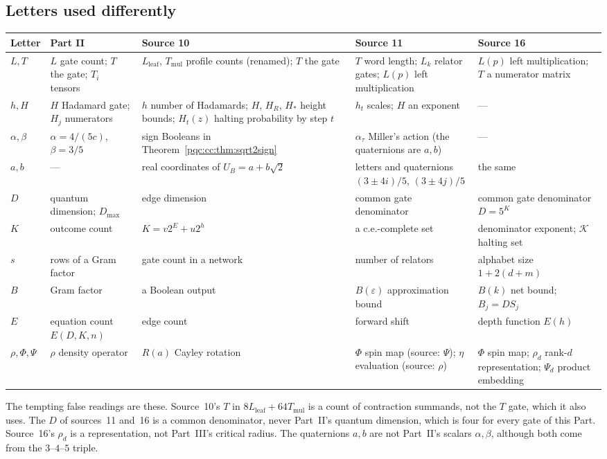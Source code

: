 \documentclass[11pt,letterpaper]{article}
\numberwithin{equation}{section}
\theoremstyle{definition}
\theoremstyle{remark}
\newcommand{\Dmax}{D_{\max}}
\newcommand{\eps}{\varepsilon}
\newcommand{\Lleaf}{L_{\mathrm{leaf}}}
\newcommand{\Tmul}{T_{\mathrm{mul}}}
\begin{document}
\subsection{Letters used differently}
\label{pqc:conv:b62-VI:letters}
\begin{center}
\small
\begin{tabularx}{\textwidth}{@{}lYYYY@{}}
\toprule
Letter & Part II & Source 10 & Source 11 & Source 16\\
\midrule
$L,T$ & $L$ gate count; $T$ the gate; $T_i$ tensors & $\Lleaf$, $\Tmul$ profile counts (renamed); $T$ the gate & $T$ word length; $L_k$ relator gates; $L(p)$ left multiplication & $L(p)$ left multiplication; $T$ a numerator matrix\\
$h,H$ & $H$ Hadamard gate; $H_j$ numerators & $h$ number of Hadamards; $H$, $H_R$, $H_*$ height bounds; $H_t(z)$ halting probability by step $t$ & $h_t$ scales; $H$ an exponent & ---\\
$\alpha,\beta$ & $\alpha=4/(5c)$, $\beta=3/5$ & sign Booleans in Theorem~\ref{pqc:cc:thm:sqrt2sign} & $\alpha_\tau$ Miller's action (the quaternions are $a,b$) & ---\\
$a,b$ & --- & real coordinates of $U_B=a+b\sqrt2$ & letters and quaternions $(3\pm4i)/5$, $(3\pm4j)/5$ & the same\\
$D$ & quantum dimension; $\Dmax$ & edge dimension & common gate denominator & common gate denominator $D=5^K$\\
$K$ & outcome count & $K=v2^E+u2^h$ & a c.e.-complete set & denominator exponent; $\mathcal K$ halting set\\
$s$ & rows of a Gram factor & gate count in a network & number of relators & alphabet size $1+2(d+m)$\\
$B$ & Gram factor & a Boolean output & $B(\eps)$ approximation bound & $B(k)$ net bound; $B_j=DS_j$\\
$E$ & equation count $E(D,K,n)$ & edge count & forward shift & depth function $E(h)$\\
$\rho,\Phi,\Psi$ & $\rho$ density operator & $R(a)$ Cayley rotation & $\Phi$ spin map (source: $\Psi$); $\eta$ evaluation (source: $\rho$) & $\Phi$ spin map; $\rho_d$ rank-$d$ representation; $\Psi_d$ product embedding\\
\bottomrule
\end{tabularx}
\end{center}

The tempting false readings are these. Source~10's $T$ in $8\Lleaf+64\Tmul$ is
a count of contraction summands, not the $T$ gate, which it also uses. The
$D$ of sources~11 and~16 is a common denominator, never Part~II's quantum
dimension, which is four for every gate of this Part. Source~16's $\rho_d$ is a
representation, not Part~III's critical radius. The quaternions $a,b$ are not
Part~II's scalars $\alpha,\beta$, although both come from the $3$--$4$--$5$
triple.
\end{document}

